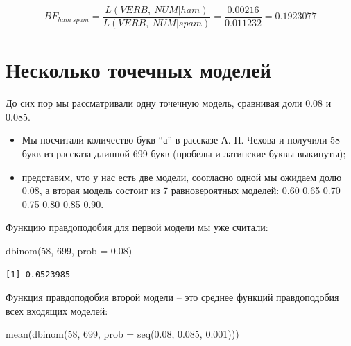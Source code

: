 \documentclass[
]{book}
\newenvironment{Shaded}{\begin{snugshade}}{\end{snugshade}}
\newcommand{\AttributeTok}[1]{\textcolor[rgb]{0.77,0.63,0.00}{#1}}
\newcommand{\DecValTok}[1]{\textcolor[rgb]{0.00,0.00,0.81}{#1}}
\newcommand{\FloatTok}[1]{\textcolor[rgb]{0.00,0.00,0.81}{#1}}
\newcommand{\FunctionTok}[1]{\textcolor[rgb]{0.00,0.00,0.00}{#1}}
\newcommand{\NormalTok}[1]{#1}
\providecommand{\tightlist}{%
  \setlength{\itemsep}{0pt}\setlength{\parskip}{0pt}}
\begin{document}
\[BF_{ham\ spam} = \frac{L(VERB,\ NUM|ham)}{L(VERB,\ NUM|spam)} = \frac{0.00216}{0.011232} = 0.1923077\]

\hypertarget{ux43dux435ux441ux43aux43eux43bux44cux43aux43e-ux442ux43eux447ux435ux447ux43dux44bux445-ux43cux43eux434ux435ux43bux435ux439}{%
\section{Несколько точечных моделей}\label{ux43dux435ux441ux43aux43eux43bux44cux43aux43e-ux442ux43eux447ux435ux447ux43dux44bux445-ux43cux43eux434ux435ux43bux435ux439}}

До сих пор мы рассматривали одну точечную модель, сравнивая доли 0.08 и 0.085.

\begin{itemize}
\tightlist
\item
  Мы посчитали количество букв ``а'' в рассказе А. П. Чехова и получили 58 букв из рассказа длинной 699 букв (пробелы и латинские буквы выкинуты);
\item
  представим, что у нас есть две модели, соогласно одной мы ожидаем долю 0.08, а вторая модель состоит из 7 равновероятных моделей: 0.60 0.65 0.70 0.75 0.80 0.85 0.90.
\end{itemize}

Функцию правдоподобия для первой модели мы уже считали:

\begin{Shaded}
\begin{Highlighting}[]
\FunctionTok{dbinom}\NormalTok{(}\DecValTok{58}\NormalTok{, }\DecValTok{699}\NormalTok{, }\AttributeTok{prob =} \FloatTok{0.08}\NormalTok{)}
\end{Highlighting}
\end{Shaded}

\begin{verbatim}
[1] 0.0523985
\end{verbatim}

Функция правдоподобия второй модели -- это среднее функций правдоподобия всех входящих моделей:

\begin{Shaded}
\begin{Highlighting}[]
\FunctionTok{mean}\NormalTok{(}\FunctionTok{dbinom}\NormalTok{(}\DecValTok{58}\NormalTok{, }\DecValTok{699}\NormalTok{, }\AttributeTok{prob =} \FunctionTok{seq}\NormalTok{(}\FloatTok{0.08}\NormalTok{, }\FloatTok{0.085}\NormalTok{, }\FloatTok{0.001}\NormalTok{)))}
\end{Highlighting}
\end{Shaded}
\end{document}
